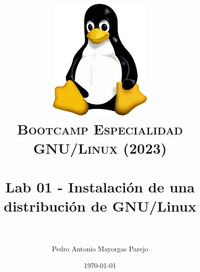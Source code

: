 

\graphicspath{ {img/} }

\title{
\normalfont \normalsize
\includegraphics[width=6cm,height=6cm]{logo}\\
\textsc{\textbf{Bootcamp Especialidad GNU/Linux (2023)}} \\ [25pt] %
\horrule{0.5pt} \\[0.4cm] %
\huge Lab 01 - Instalación de una distribución de GNU/Linux \\ %
\horrule{2pt} \\[0.5cm] %
}



\author{Pedro Antonio Mayorgas Parejo} %

\date{\normalsize\today} %




\maketitle %

\newpage %

\tableofcontents %

\newpage


